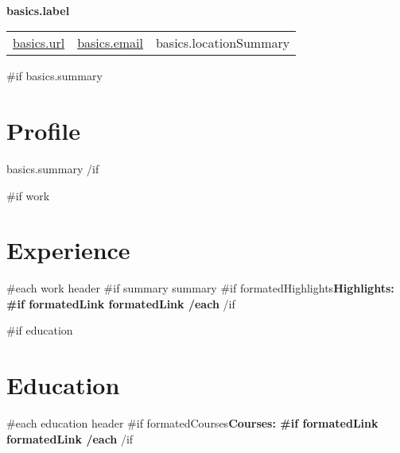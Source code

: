 \documentclass[letterpaper]{article}
\begin{document}
\begin{paracol}{2}
\begin{leftcolumn*}
\end{leftcolumn*}

\begin{rightcolumn}
  \begin{center}
    \textbf {
      \Huge
    }\\\smallskip
    \textbf {
      \color{primary-950}\large {{ basics.label }}
    }\\\smallskip

    \begin{supertabular}{lll}
      \href { {{ basics.url }} }{ {{ basics.url }} } &
      \href { mailto:{{ basics.email }} }{ {{ basics.email }} } &
       {{ basics.locationSummary }} \\
    \end{supertabular}

  \end{center}

  {{#if basics.summary}}
  \section*{Profile} {
    { {{ basics.summary }} }
  }
  {{/if}}

  {{#if work}}
  \section*{Experience} {
    {{#each work}}
      {{ header }}
      {{#if summary}}{{ summary }}
      {{#if formatedHighlights}}\bfseries Highlights: 
      {{#if formatedLink}}{{ formatedLink }}
    {{/each}}
  }
  {{/if}}
  
  {{#if education}}
  \section*{Education} {
    {{#each education}}
      {{ header }}
      {{#if formatedCourses}}\bfseries Courses: 
      {{#if formatedLink}}{{ formatedLink }}
    {{/each}}
  }
  {{/if}}


\end{rightcolumn}
\end{paracol}
\end{document}
